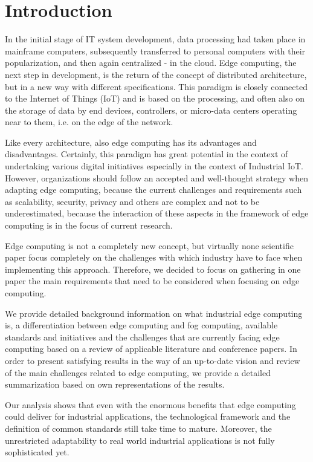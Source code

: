 \section{Introduction}\label{sec:introduction}
In the initial stage of IT system development, data processing had taken place in mainframe computers, subsequently transferred to personal computers with their popularization, and then again centralized - in the cloud. Edge computing, the next step in development, is the return of the concept of distributed architecture, but in a new way with different specifications. This paradigm is closely connected to the Internet of Things (IoT) and is based on the processing, and often also on the storage of data by end devices, controllers, or micro-data centers operating near to them, i.e. on the edge of the network.\par 
Like every architecture, also edge computing has its advantages and disadvantages. Certainly, this paradigm has great potential in the context of undertaking various digital initiatives especially in the context of Industrial IoT. However, organizations should follow an accepted and well-thought strategy when adapting edge computing, because the current challenges and requirements such as scalability, security, privacy and others are complex and not to be underestimated, because the interaction of these aspects in the framework of edge computing is in the focus of current research.\par
Edge computing is not a completely new concept, but virtually none scientific paper focus completely on the challenges with which industry have to face when implementing this approach. Therefore, we decided to focus on gathering in one paper the main requirements that need to be considered when focusing on edge computing. \par
We provide detailed background information on what industrial edge computing is, a differentiation between edge computing and fog computing, available standards and initiatives and the challenges that are currently facing edge computing based on a review of applicable literature and conference papers. In order to present satisfying results in the way of an up-to-date vision and review of the main challenges related to edge computing, we provide a detailed summarization based on own representations of the results. \par
Our analysis shows that even with the enormous benefits that edge computing could deliver for industrial applications, the technological framework and the definition of common standards still take time to mature. Moreover, the unrestricted adaptability to real world industrial applications is not fully sophisticated yet.\par 
